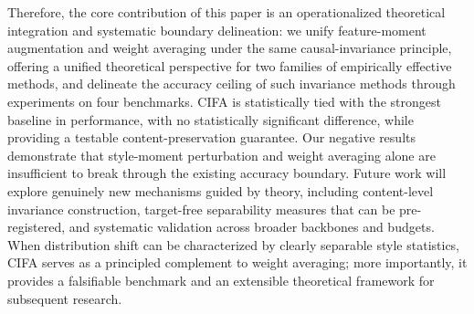 \documentclass[electronics,article,submit,moreauthors]{Definitions/mdpi}
\newcommand{\add}[1]{\textcolor{addblue}{#1}}
\newcommand{\del}[1]{\textcolor{delred}{\st{#1}}}
\def\add#1{#1}
\def\del#1{}
\begin{document}
Therefore, the core contribution of this paper is an operationalized theoretical integration and systematic boundary delineation: we unify feature-moment augmentation and weight averaging under the same causal-invariance principle, offering a unified theoretical perspective for two families of empirically effective methods, and delineate the accuracy ceiling of such invariance methods through experiments on four benchmarks. \del{CIFA is statistically equivalent to the strongest baseline in performance,}
\add{CIFA is statistically tied with the strongest baseline in performance, with no statistically significant difference,} while providing a testable content-preservation guarantee. Our negative results demonstrate that style-moment perturbation and weight averaging alone are insufficient to break through the existing accuracy boundary. Future work will explore genuinely new mechanisms guided by theory, including content-level invariance construction, target-free separability measures that can be pre-registered, and systematic validation across broader backbones and budgets. When distribution shift can be characterized by clearly separable style statistics, CIFA serves as a principled complement to weight averaging; more importantly, it provides a falsifiable benchmark and an extensible theoretical framework for subsequent research.

\del{\noindent\textbf{Data availability.} The PACS, VLCS, OfficeHome, and TerraIncognita datasets used in this study are publicly available. Source code, configuration files, and scripts to reproduce all experiments are available at \mbox{\url{https://github.com/qsongcai/CIFA}}.}









\end{document}
